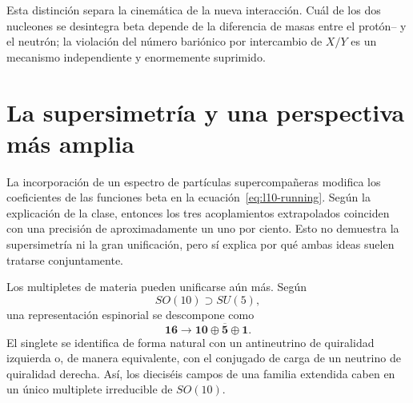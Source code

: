 \begin{classroomqa}
\end{classroomqa}

Esta distinción separa la cinemática de la nueva interacción. Cuál de los dos nucleones se desintegra beta depende de la diferencia de masas entre el protón-- y el neutrón; la violación del número bariónico por intercambio de \(X/Y\) es un mecanismo independiente y enormemente suprimido.

\section{La supersimetría y una perspectiva más amplia}

La incorporación de un espectro de partículas supercompañeras modifica los coeficientes de las funciones beta en la ecuación~\eqref{eq:l10-running}. Según la explicación de la clase, entonces los tres acoplamientos extrapolados coinciden con una precisión de aproximadamente un uno por ciento. Esto no demuestra la supersimetría ni la gran unificación, pero sí explica por qué ambas ideas suelen tratarse conjuntamente.

Los multipletes de materia pueden unificarse aún más. Según
\begin{equation}
SO(10)\supset SU(5),
\end{equation}
una representación espinorial se descompone como
\begin{equation}
\mathbf{16}
\longrightarrow
\mathbf{10}\oplus\overline{\mathbf5}\oplus\mathbf1.
\label{eq:l10-so10}
\end{equation}
El singlete se identifica de forma natural con un antineutrino de quiralidad izquierda o, de manera equivalente, con el conjugado de carga de un neutrino de quiralidad derecha. Así, los dieciséis campos de una familia extendida caben en un único multiplete irreducible de \(SO(10)\).

